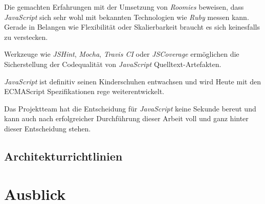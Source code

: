 Die gemachten Erfahrungen mit der Umsetzung von \emph{Roomies} beweisen, dass \emph{JavaScript} sich sehr wohl mit bekannten Technologien wie \emph{Ruby} messen kann. Gerade in Belangen wie Flexibilität oder Skalierbarkeit braucht es sich keinesfalls zu verstecken.

Werkzeuge wie \emph{JSHint}, \emph{Mocha}, \emph{Travis CI} oder \emph{JSCoverage} ermöglichen die Sicherstellung der Codequalität von \emph{JavaScript} Quelltext-Artefakten.

\emph{JavaScript} ist definitiv seinen Kinderschuhen entwachsen und wird Heute mit den ECMAScript Spezifikationen rege weiterentwickelt.

Das Projektteam hat die Entscheidung für \emph{JavaScript} keine Sekunde bereut und kann auch nach erfolgreicher Durchführung dieser Arbeit voll und ganz hinter dieser Entscheidung stehen.


\subsection*{Architekturrichtlinien}



\section*{Ausblick}


